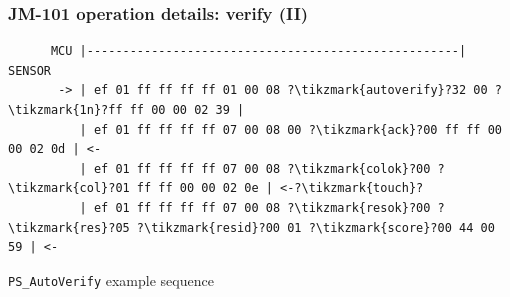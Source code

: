 \documentclass[handout]{beamer}
\begin{document}
\begin{frame}[fragile]
  \frametitle{JM-101 operation details: verify (II)}

  \begin{listing}[H]
    \begin{verbatim}
      MCU |----------------------------------------------------| SENSOR
       -> | ef 01 ff ff ff ff 01 00 08 ?\tikzmark{autoverify}?32 00 ?\tikzmark{1n}?ff ff 00 00 02 39 |
          | ef 01 ff ff ff ff 07 00 08 00 ?\tikzmark{ack}?00 ff ff 00 00 02 0d | <-
          | ef 01 ff ff ff ff 07 00 08 ?\tikzmark{colok}?00 ?\tikzmark{col}?01 ff ff 00 00 02 0e | <-?\tikzmark{touch}?
          | ef 01 ff ff ff ff 07 00 08 ?\tikzmark{resok}?00 ?\tikzmark{res}?05 ?\tikzmark{resid}?00 01 ?\tikzmark{score}?00 44 00 59 | <-
    \end{verbatim}
    \caption{\texttt{PS\_AutoVerify} example sequence}
  \end{listing}


\end{frame}
\end{document}
